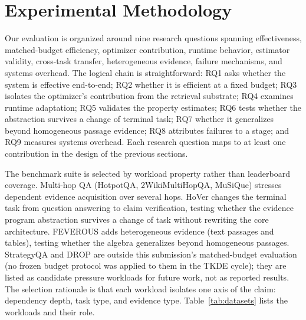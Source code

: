 \section{Experimental Methodology}
\label{sec:experiments}

Our evaluation is organized around nine research questions spanning
effectiveness, matched-budget efficiency, optimizer contribution, runtime
behavior, estimator validity, cross-task transfer, heterogeneous evidence,
failure mechanisms, and systems overhead. The logical chain is
straightforward: RQ1 asks whether the system is effective end-to-end; RQ2
whether it is efficient at a fixed budget; RQ3 isolates the optimizer's
contribution from the retrieval substrate; RQ4 examines runtime adaptation;
RQ5 validates the property estimates; RQ6 tests whether the abstraction
survives a change of terminal task; RQ7 whether it generalizes beyond
homogeneous passage evidence; RQ8 attributes failures to a stage; and RQ9
measures systems overhead. Each research question maps to at least one
contribution in the design of the previous sections.

The benchmark suite is selected by workload property rather than leaderboard
coverage. Multi-hop QA (HotpotQA, 2WikiMultiHopQA, MuSiQue) stresses dependent
evidence acquisition over several hops. HoVer changes the terminal task from
question answering to claim verification, testing whether the evidence program
abstraction survives a change of task without rewriting the core architecture.
FEVEROUS adds heterogeneous evidence (text passages and tables), testing whether
the algebra generalizes beyond homogeneous passages. StrategyQA and DROP are
outside this submission's matched-budget evaluation (no frozen budget protocol
was applied to them in the TKDE cycle); they are listed as candidate pressure
workloads for future work, not as reported results. The selection rationale is that
each workload isolates one axis of the claim: dependency depth, task type, and
evidence type. Table~\ref{tab:datasets} lists the workloads and their role.

